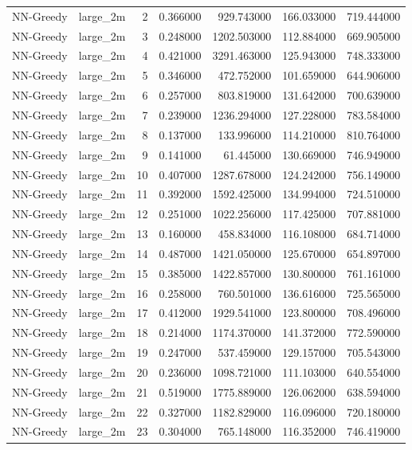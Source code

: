 \begin{tabular}{llrrrrr}
NN-Greedy & large_2m & 2 & 0.366000 & 929.743000 & 166.033000 & 719.444000 \\
NN-Greedy & large_2m & 3 & 0.248000 & 1202.503000 & 112.884000 & 669.905000 \\
NN-Greedy & large_2m & 4 & 0.421000 & 3291.463000 & 125.943000 & 748.333000 \\
NN-Greedy & large_2m & 5 & 0.346000 & 472.752000 & 101.659000 & 644.906000 \\
NN-Greedy & large_2m & 6 & 0.257000 & 803.819000 & 131.642000 & 700.639000 \\
NN-Greedy & large_2m & 7 & 0.239000 & 1236.294000 & 127.228000 & 783.584000 \\
NN-Greedy & large_2m & 8 & 0.137000 & 133.996000 & 114.210000 & 810.764000 \\
NN-Greedy & large_2m & 9 & 0.141000 & 61.445000 & 130.669000 & 746.949000 \\
NN-Greedy & large_2m & 10 & 0.407000 & 1287.678000 & 124.242000 & 756.149000 \\
NN-Greedy & large_2m & 11 & 0.392000 & 1592.425000 & 134.994000 & 724.510000 \\
NN-Greedy & large_2m & 12 & 0.251000 & 1022.256000 & 117.425000 & 707.881000 \\
NN-Greedy & large_2m & 13 & 0.160000 & 458.834000 & 116.108000 & 684.714000 \\
NN-Greedy & large_2m & 14 & 0.487000 & 1421.050000 & 125.670000 & 654.897000 \\
NN-Greedy & large_2m & 15 & 0.385000 & 1422.857000 & 130.800000 & 761.161000 \\
NN-Greedy & large_2m & 16 & 0.258000 & 760.501000 & 136.616000 & 725.565000 \\
NN-Greedy & large_2m & 17 & 0.412000 & 1929.541000 & 123.800000 & 708.496000 \\
NN-Greedy & large_2m & 18 & 0.214000 & 1174.370000 & 141.372000 & 772.590000 \\
NN-Greedy & large_2m & 19 & 0.247000 & 537.459000 & 129.157000 & 705.543000 \\
NN-Greedy & large_2m & 20 & 0.236000 & 1098.721000 & 111.103000 & 640.554000 \\
NN-Greedy & large_2m & 21 & 0.519000 & 1775.889000 & 126.062000 & 638.594000 \\
NN-Greedy & large_2m & 22 & 0.327000 & 1182.829000 & 116.096000 & 720.180000 \\
NN-Greedy & large_2m & 23 & 0.304000 & 765.148000 & 116.352000 & 746.419000 \\

\end{tabular}
